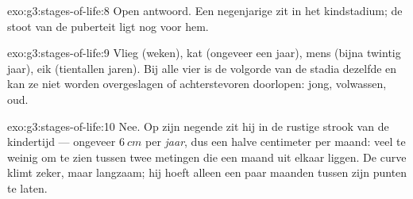 \begin{solution}{exo:g3:stages-of-life:8}
Open antwoord. Een negenjarige zit in het kindstadium; de stoot van de
puberteit ligt nog voor hem.
\end{solution}

\begin{solution}{exo:g3:stages-of-life:9}
Vlieg (weken), kat (ongeveer een jaar), mens (bijna twintig jaar), eik
(tientallen jaren). Bij alle vier is de volgorde van de stadia dezelfde
en kan ze niet worden overgeslagen of achterstevoren doorlopen: jong,
volwassen, oud.
\end{solution}

\begin{solution}{exo:g3:stages-of-life:10}
Nee. Op zijn negende zit hij in de rustige strook van de kindertijd ---
ongeveer $\qty{6}{cm}$ per \emph{jaar}, dus een halve centimeter per
maand: veel te weinig om te zien tussen twee metingen die een maand uit
elkaar liggen. De curve klimt zeker, maar langzaam; hij hoeft alleen
een paar maanden tussen zijn punten te laten.
\end{solution}
